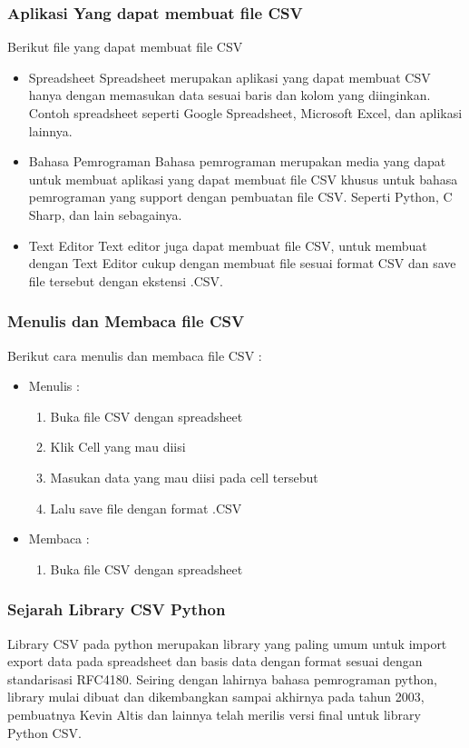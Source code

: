 \subsubsection{Aplikasi Yang dapat membuat file CSV}
Berikut file yang dapat membuat file CSV
\begin{itemize}
	\item Spreadsheet \linebreak Spreadsheet merupakan aplikasi yang dapat membuat CSV hanya dengan memasukan data sesuai baris dan kolom yang diinginkan. Contoh spreadsheet seperti Google Spreadsheet, Microsoft Excel, dan aplikasi lainnya. 
	\item Bahasa Pemrograman \linebreak Bahasa pemrograman merupakan media yang dapat untuk membuat aplikasi yang dapat membuat file CSV khusus untuk bahasa pemrograman yang support dengan pembuatan file CSV. Seperti Python, C Sharp, dan lain sebagainya.
	\item Text Editor \linebreak Text editor juga dapat membuat file CSV, untuk membuat dengan Text Editor cukup dengan membuat file sesuai format CSV dan save file tersebut dengan ekstensi .CSV.
\end{itemize}
\subsubsection{Menulis dan Membaca file CSV}
Berikut cara menulis dan membaca file CSV : 
\begin{itemize}
	\item Menulis : \begin{enumerate}
						\item Buka file CSV dengan spreadsheet
						\item Klik Cell yang mau diisi
						\item Masukan data yang mau diisi pada cell tersebut
						\item Lalu save file dengan format .CSV
					\end{enumerate}
	\item Membaca : \begin{enumerate}
						\item Buka file CSV dengan spreadsheet						
					\end{enumerate}
\end{itemize}
\subsubsection{Sejarah Library CSV Python}
Library CSV pada python merupakan library yang paling umum untuk import export data pada spreadsheet dan basis data dengan format sesuai dengan standarisasi RFC4180. Seiring dengan lahirnya bahasa pemrograman python, library mulai dibuat dan dikembangkan sampai akhirnya pada tahun 2003, pembuatnya Kevin Altis dan lainnya telah merilis versi final untuk library Python CSV. 

